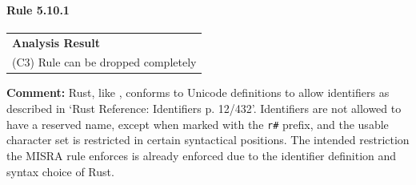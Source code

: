 \paragraph{Rule 5.10.1}
\begin{longtable}{p{13cm}}
\textbf{Analysis Result} \\
(C3) Rule can be dropped completely \\
\end{longtable}
\textbf{Comment:} Rust, like \Cpp, conforms to Unicode definitions to allow identifiers as described in `Rust Reference: Identifiers p. 12/432'. Identifiers are not allowed to have a reserved name, except when marked with the \texttt{r\#} prefix, and the usable character set is restricted in certain syntactical positions. The intended restriction the MISRA rule enforces is already enforced due to the identifier definition and syntax choice of Rust. \\
